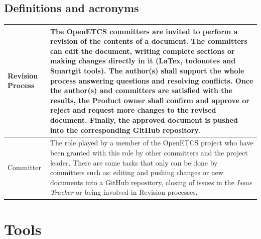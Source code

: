 \documentclass{template/openetcs_article}
\begin{document}
\subsection{Definitions and acronyms}
\tablehead{}
\tabletail{}
\tablelasttail{}
\begin{supertabular}{|m{3cm}m{11cm}|}
\hline
Revision Process &
The OpenETCS committers are invited to perform a revision of the contents of a document. The committers can edit the document, writing complete sections or making changes directly in it (LaTex, todonotes and Smartgit tools). The author(s) shall support the whole process answering questions and resolving conflicts. Once the author(s) and committers are satisfied with the results, the Product owner shall confirm and approve or reject and request more changes to the revised document. Finally, the approved document is pushed into the corresponding GitHub repository.
\\\hline
Committer &
The role played by a member of the OpenETCS project who have been granted with this role by other committers and the project leader. There are some tasks that only can be done by committers such as: editing and pushing changes or new documents into a GitHub repository, closing of issues in the {\it Issue Tracker} or being involved in Revision processes.
\\\hline
\end{supertabular}

\section{Tools}
\end{document}
